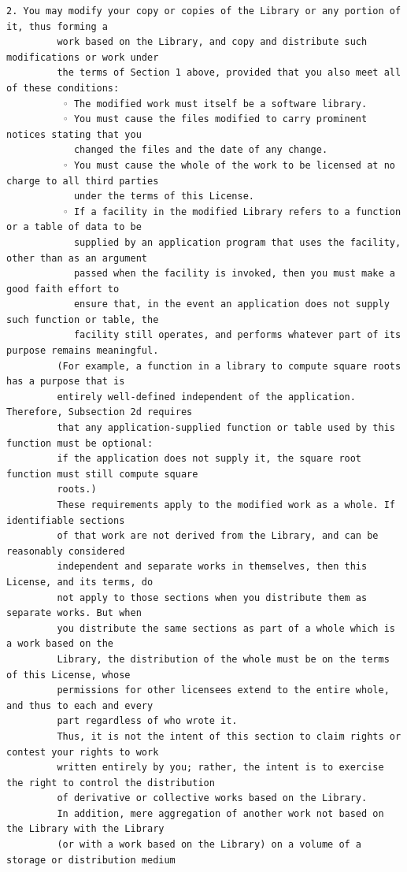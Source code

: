 \begin{lstlisting}[basicstyle=\ttfamily\footnotesize,breaklines=true]
      2. You may modify your copy or copies of the Library or any portion of it, thus forming a
         work based on the Library, and copy and distribute such modifications or work under
         the terms of Section 1 above, provided that you also meet all of these conditions:
          ◦ The modified work must itself be a software library.
          ◦ You must cause the files modified to carry prominent notices stating that you
            changed the files and the date of any change.
          ◦ You must cause the whole of the work to be licensed at no charge to all third parties
            under the terms of this License.
          ◦ If a facility in the modified Library refers to a function or a table of data to be
            supplied by an application program that uses the facility, other than as an argument
            passed when the facility is invoked, then you must make a good faith effort to
            ensure that, in the event an application does not supply such function or table, the
            facility still operates, and performs whatever part of its purpose remains meaningful.
         (For example, a function in a library to compute square roots has a purpose that is
         entirely well-defined independent of the application. Therefore, Subsection 2d requires
         that any application-supplied function or table used by this function must be optional:
         if the application does not supply it, the square root function must still compute square
         roots.)
         These requirements apply to the modified work as a whole. If identifiable sections
         of that work are not derived from the Library, and can be reasonably considered
         independent and separate works in themselves, then this License, and its terms, do
         not apply to those sections when you distribute them as separate works. But when
         you distribute the same sections as part of a whole which is a work based on the
         Library, the distribution of the whole must be on the terms of this License, whose
         permissions for other licensees extend to the entire whole, and thus to each and every
         part regardless of who wrote it.
         Thus, it is not the intent of this section to claim rights or contest your rights to work
         written entirely by you; rather, the intent is to exercise the right to control the distribution
         of derivative or collective works based on the Library.
         In addition, mere aggregation of another work not based on the Library with the Library
         (or with a work based on the Library) on a volume of a storage or distribution medium

\end{lstlisting}
